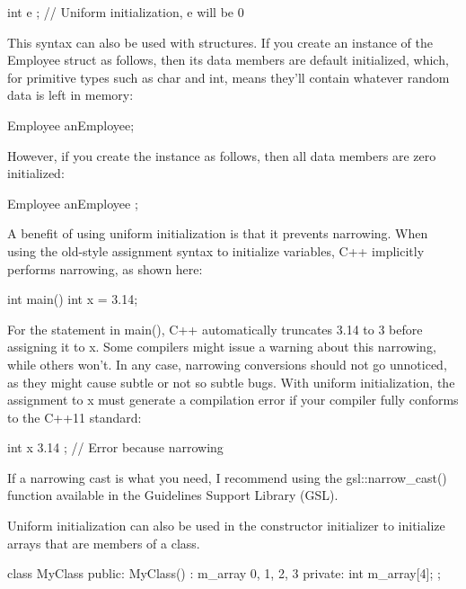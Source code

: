 \begin{cpp}
int e { }; // Uniform initialization, e will be 0
\end{cpp}

This syntax can also be used with structures. If you create an instance of the Employee struct as follows, then its data members are default initialized, which, for primitive types such as char and int, means they’ll contain whatever random data is left in memory:

\begin{cpp}
Employee anEmployee;
\end{cpp}

However, if you create the instance as follows, then all data members are zero initialized:

\begin{cpp}
Employee anEmployee { };
\end{cpp}

A benefit of using uniform initialization is that it prevents narrowing. When using the old-style assignment syntax to initialize variables, C++ implicitly performs narrowing, as shown here:

\begin{cpp}
int main()
{
    int x = 3.14;
}
\end{cpp}

For the statement in main(), C++ automatically truncates 3.14 to 3 before assigning it to x. Some compilers might issue a warning about this narrowing, while others won’t. In any case, narrowing conversions should not go unnoticed, as they might cause subtle or not so subtle bugs. With uniform initialization, the assignment to x must generate a compilation error if your compiler fully conforms to the C++11 standard:

\begin{cpp}
int x { 3.14 }; // Error because narrowing
\end{cpp}

If a narrowing cast is what you need, I recommend using the gsl::narrow\_cast() function available in the Guidelines Support Library (GSL).

Uniform initialization can also be used in the constructor initializer to initialize arrays that are members of a class.

\begin{cpp}
class MyClass
{
    public:
        MyClass()
            : m_array { 0, 1, 2, 3 }
        {
        }
    private:
        int m_array[4];
};
\end{cpp}


